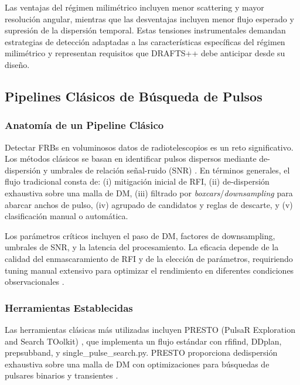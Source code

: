 Las ventajas del régimen milimétrico incluyen menor scattering y mayor resolución angular, mientras que las desventajas incluyen menor flujo esperado y supresión de la dispersión temporal. Estas tensiones instrumentales demandan estrategias de detección adaptadas a las características específicas del régimen milimétrico \citep{veracasanova2025} y representan requisitos que DRAFTS++ debe anticipar desde su diseño.

\subsection{Pipelines Clásicos de Búsqueda de Pulsos}

\subsubsection{Anatomía de un Pipeline Clásico}

Detectar FRBs en voluminosos datos de radiotelescopios es un reto significativo. Los métodos clásicos se basan en identificar pulsos dispersos mediante de-dispersión y umbrales de relación señal-ruido (SNR) \citep{CordesMcLaughlin2003}. En términos generales, el flujo tradicional consta de: (i) mitigación inicial de RFI, (ii) de-dispersión exhaustiva sobre una malla de DM, (iii) filtrado por \textit{boxcars}/\textit{downsampling} para abarcar anchos de pulso, (iv) agrupado de candidatos y reglas de descarte, y (v) clasificación manual o automática.

Los parámetros críticos incluyen el paso de DM, factores de downsampling, umbrales de SNR, y la latencia del procesamiento. La eficacia depende de la calidad del enmascaramiento de RFI y de la elección de parámetros, requiriendo tuning manual extensivo para optimizar el rendimiento en diferentes condiciones observacionales \citep{Ransom_2003}.

\subsubsection{Herramientas Establecidas}

Las herramientas clásicas más utilizadas incluyen PRESTO (PulsaR Exploration and Search TOolkit) \citep{2011ascl.soft07017R}, que implementa un flujo estándar con rfifind, DDplan, prepsubband, y single\_pulse\_search.py. PRESTO proporciona dedispersión exhaustiva sobre una malla de DM con optimizaciones para búsquedas de pulsares binarios y transientes \citep{Ransom_2003}.

